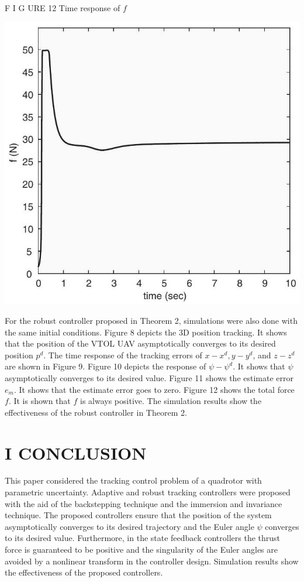 \documentclass[10pt]{article}
\begin{document}
F I G URE 12 Time response of $f$

\begin{center}
\includegraphics[max width=\textwidth]{2023_10_07_eefdf58cc80a47c1244eg-13(2)}
\end{center}

For the robust controller proposed in Theorem 2, simulations were also done with the same initial conditions. Figure 8 depicts the 3D position tracking. It shows that the position of the VTOL UAV asymptotically converges to its desired position $p^{d}$. The time response of the tracking errors of $x-x^{d}, y-y^{d}$, and $z-z^{d}$ are shown in Figure 9. Figure 10 depicts the response of $\psi-\psi^{d}$. It shows that $\psi$ asymptotically converges to its desired value. Figure 11 shows the estimate error $e_{m}$. It shows that the estimate error goes to zero. Figure 12 shows the total force $f$. It is shown that $f$ is always positive. The simulation results show the effectiveness of the robust controller in Theorem 2.

\section{I CONCLUSION}
This paper considered the tracking control problem of a quadrotor with parametric uncertainty. Adaptive and robust tracking controllers were proposed with the aid of the backstepping technique and the immersion and invariance technique. The proposed controllers ensure that the position of the system asymptotically converges to its desired trajectory and the Euler angle $\psi$ converges to its desired value. Furthermore, in the state feedback controllers the thrust force is guaranteed to be positive and the singularity of the Euler angles are avoided by a nonlinear transform in the controller design. Simulation results show the effectiveness of the proposed controllers.
\end{document}
